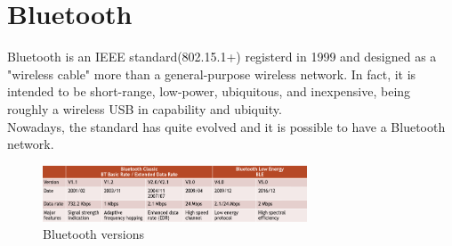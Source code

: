 \chapter{Bluetooth}
\label{chap:bluetooth}

Bluetooth is an IEEE standard(802.15.1+) registerd in 1999 and designed as a "wireless cable" more 
than a general-purpose wireless network. In fact, it is intended to be short-range, low-power, 
ubiquitous, and inexpensive, being roughly a wireless USB in capability and ubiquity.\\
Nowadays, the standard has quite evolved and it is possible to have a Bluetooth network.\\
\begin{figure}[H]
  \centering
  \includegraphics[width=0.7\textwidth]{img/wireless/bluetooth versions.png}
  \caption{Bluetooth versions}
\end{figure}
